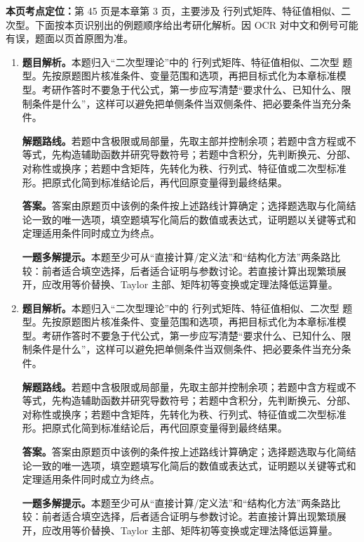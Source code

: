 \begin{solutionblock}
\textbf{本页考点定位：}第 45 页是本章第 3 页，主要涉及 行列式矩阵、特征值相似、二次型。下面按本页识别出的例题顺序给出考研化解析。因 OCR 对中文和例号可能有误，题面以页首原图为准。

\begin{enumerate}[label=\textbf{例\arabic*.}, leftmargin=2.4em]

\item \textbf{题目解析。}本题归入“二次型理论”中的 行列式矩阵、特征值相似、二次型 题型。先按原题图片核准条件、变量范围和选项，再把目标式化为本章标准模型。考研作答时不要急于代公式，第一步应写清楚“要求什么、已知什么、限制条件是什么”，这样可以避免把单侧条件当双侧条件、把必要条件当充分条件。

\textbf{解题路线。}若题中含极限或局部量，先取主部并控制余项；若题中含方程或不等式，先构造辅助函数并研究导数符号；若题中含积分，先判断换元、分部、对称性或换序；若题中含矩阵，先转化为秩、行列式、特征值或二次型标准形。把原式化简到标准结论后，再代回原变量得到最终结果。

\textbf{答案。}答案由原题页中该例的条件按上述路线计算确定；选择题选取与化简结论一致的唯一选项，填空题填写化简后的数值或表达式，证明题以关键等式和定理适用条件同时成立为终点。

\textbf{一题多解提示。}本题至少可从“直接计算/定义法”和“结构化方法”两条路比较：前者适合填空选择，后者适合证明与参数讨论。若直接计算出现繁琐展开，应改用等价替换、Taylor 主部、矩阵初等变换或定理法降低运算量。

\item \textbf{题目解析。}本题归入“二次型理论”中的 行列式矩阵、特征值相似、二次型 题型。先按原题图片核准条件、变量范围和选项，再把目标式化为本章标准模型。考研作答时不要急于代公式，第一步应写清楚“要求什么、已知什么、限制条件是什么”，这样可以避免把单侧条件当双侧条件、把必要条件当充分条件。

\textbf{解题路线。}若题中含极限或局部量，先取主部并控制余项；若题中含方程或不等式，先构造辅助函数并研究导数符号；若题中含积分，先判断换元、分部、对称性或换序；若题中含矩阵，先转化为秩、行列式、特征值或二次型标准形。把原式化简到标准结论后，再代回原变量得到最终结果。

\textbf{答案。}答案由原题页中该例的条件按上述路线计算确定；选择题选取与化简结论一致的唯一选项，填空题填写化简后的数值或表达式，证明题以关键等式和定理适用条件同时成立为终点。

\textbf{一题多解提示。}本题至少可从“直接计算/定义法”和“结构化方法”两条路比较：前者适合填空选择，后者适合证明与参数讨论。若直接计算出现繁琐展开，应改用等价替换、Taylor 主部、矩阵初等变换或定理法降低运算量。

\end{enumerate}
\end{solutionblock}



